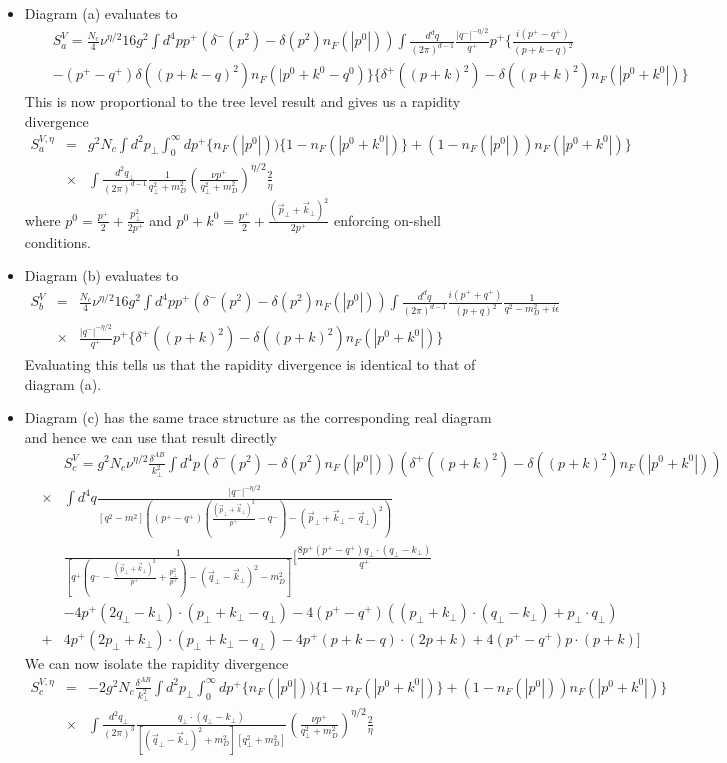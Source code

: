 \documentclass[letter,11pt]{article}
\newcommand{\nn}{\nonumber}
\newcommand{\bea}{\begin{eqnarray}}
\newcommand{\eea}{\end{eqnarray}}
\def\nn{\nonumber}
\begin{document}
\begin{itemize}
\item
Diagram (a) evaluates to 
\bea
&&S_a^V=\frac{N_c}{4}\nu^{\eta/2}16g^2\int d^4p p^+(\delta^-(p^2)-\delta(p^2)n_F(|p^0|))\int \frac{d^dq}{(2\pi)^{d-1}}\frac{|q^-|^{-\eta/2}}{q^+}p^+\Big\{\frac{i(p^+-q^+)}{(p+k-q)^2} \nn\\
&&-(p^+-q^+)\delta((p+k-q)^2)n_F(|p^0+k^0-q^0)\Big\}\Big\{\delta^+((p+k)^2)-\delta((p+k)^2)n_F(|p^0+k^0|)\Big\}\nn
\eea
This is now proportional to the tree level result and gives us a rapidity divergence 
\bea
 S_a^{V,\eta}&=&g^2N_c\int d^2p_{\perp}\int_0^{\infty}dp^+\Bigg\{ n_F(|p^0|))\Big\{1-n_F(|p^0+k^0|)\Big\}+ (1-n_F(|p^0|))n_F(|p^0+k^0|)\Bigg\}\nn\\
&\times&\int \frac{d^2q_{\perp}}{(2\pi)^{d-1}}\frac{1}{q_{\perp}^2+m_D^2}\left(\frac{\nu p^+}{q_{\perp}^2+m_D^2}\right)^{\eta/2}\frac{2}{\eta}
\eea
where $p^0 = \frac{p^+}{2}+ \frac{p_{\perp}^2}{2p^+}$ and $ p^0+k^0 = \frac{p^+}{2}+\frac{(\vec{p}_{\perp}+\vec{k}_{\perp})^2}{2p^+}$ enforcing on-shell conditions.
\item
Diagram (b) evaluates to 
\bea
S_b^V&=&\frac{N_c}{4}\nu^{\eta/2}16g^2\int d^4p p^+(\delta^-(p^2)-\delta(p^2)n_F(|p^0|))\int \frac{d^dq}{(2\pi)^{d-1}}\frac{i(p^++q^+)}{(p+q)^2}\frac{1}{q^2-m_D^2+i\epsilon}\nn\\
&\times& \frac{|q^-|^{-\eta/2}}{q^+}p^+\Big\{\delta^+((p+k)^2)-\delta((p+k)^2)n_F(|p^0+k^0|)\Big\}
\eea
Evaluating this tells us that the rapidity divergence is identical to that of diagram (a). 
\item 
Diagram (c) has the same trace structure as the corresponding real diagram and hence we can use that result directly 
\small 
\bea
  &&S_c^V= g^2N_c\nu^{\eta/2}\frac{\delta^{AB}}{k_{\perp}^2}\int d^4p\left( \delta^-(p^2)-\delta(p^2)n_F(|p^0|)\right)\left(\delta^+((p+k)^2)-\delta((p+k)^2)n_F(|p^0+k^0|)\right)\nn\\
&\times& \int d^4q \frac{|q^-|^{-\eta/2}}{[q^2-m^2]\left((p^+-q^+)(\frac{(\vec{p}_{\perp}+\vec{k}_{\perp})^2}{p^+}-q^-)-(\vec{p}_{\perp}+\vec{k}_{\perp}-\vec{q}_{\perp})^2\right)}\nn\\
&&\frac{1}{[q^+(q^--\frac{(\vec{p}_{\perp}+\vec{k}_{\perp})^2}{p^+}+\frac{p_{\perp}^2}{p^+})-(\vec{q}_{\perp}-\vec{k}_{\perp})^2 -m_D^2]}\Big[\frac{8p^+(p^+-q^+)q_{\perp}\cdot(q_{\perp}-k_{\perp})}{q^+}\nn\\
&&-4p^+(2q_{\perp}-k_{\perp})\cdot(p_{\perp}+k_{\perp}-q_{\perp})-4(p^+-q^+)((p_{\perp}+k_{\perp})\cdot(q_{\perp}-k_{\perp})+p_{\perp}\cdot q_{\perp})\nn\\
&+&4p^+(2p_{\perp}+k_{\perp})\cdot(p_{\perp}+k_{\perp}-q_{\perp})-4p^+(p+k-q)\cdot(2p+k)+4(p^+-q^+)p\cdot(p+k)\Big]
\eea
\normalsize
We can now isolate the rapidity divergence 
\bea
 S_c^{V,\eta}&=& -2g^2N_c\frac{\delta^{AB}}{k_{\perp}^2}\int d^2p_{\perp}\int_0^{\infty}dp^+\Bigg\{ n_F(|p^0|))\Big\{1-n_F(|p^0+k^0|)\Big\}+ (1-n_F(|p^0|))n_F(|p^0+k^0|)\Bigg\}\nn\\
&\times&\int\frac{ d^2q_{\perp}}{(2\pi)^3}\frac{q_{\perp}\cdot(q_{\perp}-k_{\perp})}{[(\vec{q}_{\perp}-\vec{k}_{\perp})^2+m_D^2][q_{\perp}^2+m_D^2]}\left(\frac{\nu p^+}{q_{\perp}^2+m_D^2}\right)^{\eta/2}\frac{2}{\eta}
\eea


\end{itemize}
\end{document}
